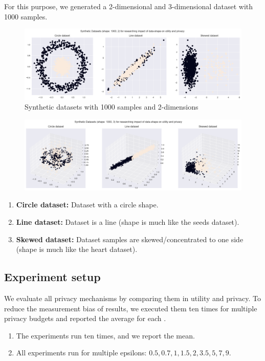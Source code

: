 For this purpose, we generated a 2-dimensional and 3-dimensional dataset with 1000 samples.
\begin{figure}[H]
    \includegraphics[width=1.0\textwidth]{Method//images/2d-shapes.png}
    \caption{Synthetic datasets with 1000 samples and 2-dimensions}
    \label{rq3:synthetic-datasets}
\end{figure}
\begin{figure}[H]
    \includegraphics[width=1.0\textwidth]{3d-shapes.png}
    \label{rq3:synthetic-datasets-3d}
\end{figure}

\begin{enumerate}
    \item \textbf{Circle dataset:} Dataset with a circle shape.
    \item \textbf{Line dataset:} Dataset is a line (shape is much like the seeds dataset).
    \item \textbf{Skewed dataset:} Dataset samples are skewed/concentrated to one side (shape is much like the heart dataset).
\end{enumerate}

\subsection{Experiment setup}
We evaluate all privacy mechanisms by comparing them in utility and privacy.
To reduce the measurement bias of results, we executed them ten times for multiple privacy budgets and reported the average for each \citep{9679364}.
\begin{enumerate}
    \item The experiments run ten times, and we report the mean.
    \item All experiments run for multiple epsilons: ${0.5, 0.7, 1, 1.5, 2, 3.5, 5, 7, 9}$.
\end{enumerate}
\newpage

